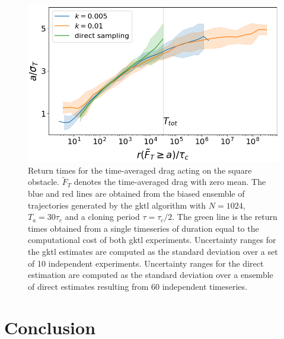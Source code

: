 \documentclass{jfm}
\begin{document}
\begin{figure}
	\centering
	\includegraphics[width=.7\linewidth]{return_times_GKTL/return_times_GKTL}
	\caption{\label{fig:return_times_gktl} Return times for the time-averaged drag acting on the square obstacle. $\tilde{F}_T$ denotes the time-averaged drag with zero mean. The blue and red lines are obtained from the biased ensemble of trajectories generated by the \ac{gktl} algorithm with $N=1024$, $T_a=30\tau_c$ and a cloning period $\tau=\tau_c/2$. The green line is the return times obtained from a single timeseries of duration equal to the computational cost of both \ac{gktl} experiments. Uncertainty ranges for the \ac{gktl} estimates are computed as the standard deviation over a set of 10 independent experiments. Uncertainty ranges for the direct estimation are computed as the standard deviation over a ensemble of direct estimates resulting from 60 independent timeseries.}
\end{figure}

\section{Conclusion}
\label{conlusion}

 
\end{document}

